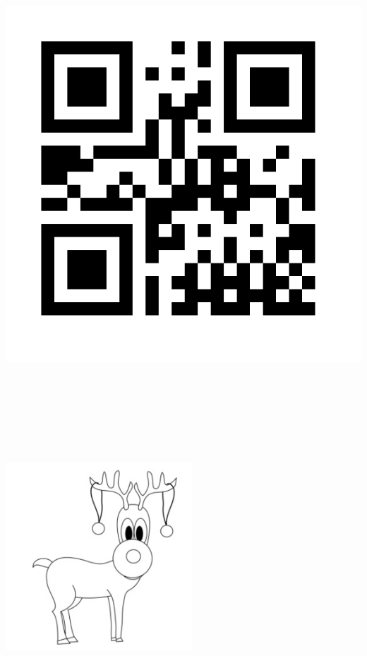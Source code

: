\documentclass{article}
\begin{document}
\pagestyle{empty}
\begin{center}
\includegraphics[height=20cm]{Rennes}

\vspace{5mm}

\includegraphics[height=7cm]{Renne}
\end{center}
\end{document}
